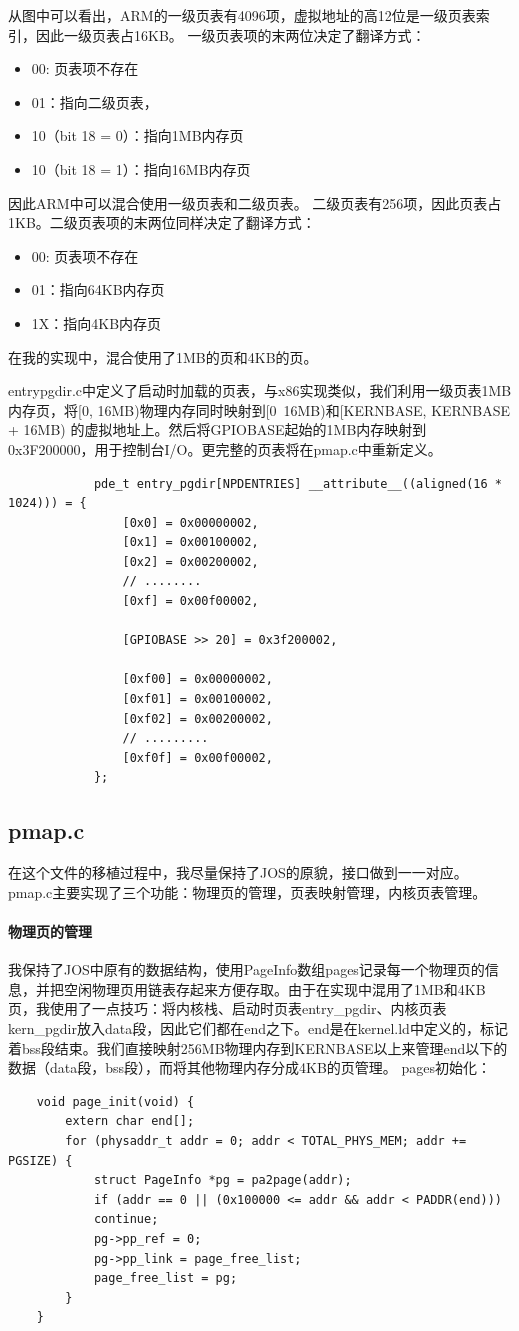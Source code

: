 \documentclass[11pt,a4paper]{article}
\begin{document}
\begin{CJK}{UTF8}{gkai}
		从图中可以看出，ARM的一级页表有4096项，虚拟地址的高12位是一级页表索引，因此一级页表占16KB。
		一级页表项的末两位决定了翻译方式：
		\begin{itemize}
			\item 00: 页表项不存在
			\item 01：指向二级页表，
			\item 10（bit 18 = 0）：指向1MB内存页
			\item 10（bit 18 = 1）：指向16MB内存页
		\end{itemize}
		因此ARM中可以混合使用一级页表和二级页表。
		二级页表有256项，因此页表占1KB。二级页表项的末两位同样决定了翻译方式：
		\begin{itemize}
			\item 00: 页表项不存在
			\item 01：指向64KB内存页
			\item 1X：指向4KB内存页
		\end{itemize}	
		在我的实现中，混合使用了1MB的页和4KB的页。
		
		entrypgdir.c中定义了启动时加载的页表，与x86实现类似，我们利用一级页表1MB内存页，将[0, 16MB)物理内存同时映射到[0~16MB)和[KERNBASE, KERNBASE + 16MB)
		的虚拟地址上。然后将GPIOBASE起始的1MB内存映射到0x3F200000，用于控制台I/O。更完整的页表将在pmap.c中重新定义。
		\begin{lstlisting}
			pde_t entry_pgdir[NPDENTRIES] __attribute__((aligned(16 * 1024))) = {
				[0x0] = 0x00000002,
				[0x1] = 0x00100002,
				[0x2] = 0x00200002,
				// ........
				[0xf] = 0x00f00002,
				
				[GPIOBASE >> 20] = 0x3f200002,
				
				[0xf00] = 0x00000002,
				[0xf01] = 0x00100002,
				[0xf02] = 0x00200002,
				// .........
				[0xf0f] = 0x00f00002,
			};
		\end{lstlisting}
		
	\subsection{pmap.c}
	在这个文件的移植过程中，我尽量保持了JOS的原貌，接口做到一一对应。
	pmap.c主要实现了三个功能：物理页的管理，页表映射管理，内核页表管理。
	\paragraph{物理页的管理}
	我保持了JOS中原有的数据结构，使用PageInfo数组pages记录每一个物理页的信息，并把空闲物理页用链表存起来方便存取。由于在实现中混用了1MB和4KB页，我使用了一点技巧：将内核栈、启动时页表entry\_pgdir、内核页表kern\_pgdir放入data段，因此它们都在end之下。end是在kernel.ld中定义的，标记着bss段结束。我们直接映射256MB物理内存到KERNBASE以上来管理end以下的数据（data段，bss段），而将其他物理内存分成4KB的页管理。
	pages初始化：
	\begin{lstlisting}
	void page_init(void) {
		extern char end[];
		for (physaddr_t addr = 0; addr < TOTAL_PHYS_MEM; addr += PGSIZE) {
			struct PageInfo *pg = pa2page(addr);
			if (addr == 0 || (0x100000 <= addr && addr < PADDR(end)))
			continue;
			pg->pp_ref = 0;
			pg->pp_link = page_free_list;
			page_free_list = pg;
		}
	}
	\end{lstlisting}
	

\end{CJK}
\end{document}
